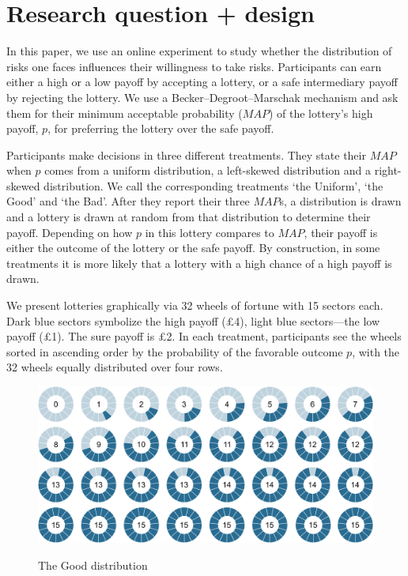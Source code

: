 \documentclass[12pt, a4paper]{article}
\begin{document}
\section{Research question + design}

In this paper, we use an online experiment to study whether the distribution of risks one faces influences their willingness to take risks.
Participants can earn either a high or a low payoff by accepting a lottery, or a safe intermediary payoff by rejecting the lottery.
We use a Becker--Degroot--Marschak mechanism and ask them for their minimum acceptable probability ($MAP$) of the lottery's high payoff, $p$, for preferring the lottery over the safe payoff.

Participants make decisions in three different treatments.
They state their $MAP$ when $p$ comes from a uniform distribution, a left-skewed distribution and a right-skewed distribution.
We call the corresponding treatments `the Uniform', `the Good' and `the Bad'.
After they report their three $MAP$s, a distribution is drawn and a lottery is drawn at random from that distribution to determine their payoff.
Depending on how $p$ in this lottery compares to $MAP$, their payoff is either the outcome of the lottery or the safe payoff.
By construction, in some treatments it is more likely that a lottery with a high chance of a high payoff is drawn.

We present lotteries graphically via 32 wheels of fortune with 15 sectors each.
Dark blue sectors symbolize the high payoff (\pounds4), light blue sectors---the low payoff (\pounds1).
The sure payoff is \pounds2.
In each treatment, participants see the wheels sorted in ascending order by the probability of the favorable outcome $p$, with the 32 wheels equally distributed over four rows.

\begin{figure}[h!]
  \centering
 {\includegraphics[width=\linewidth]{Fig1_Left_15.pdf}}
  \caption{The Good distribution}
  \label{fig:TheGood}
\end{figure}
\end{document}
